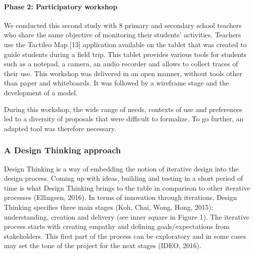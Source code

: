 \documentclass[preprint,12pt]{elsarticle}
\begin{document}
\paragraph{Phase 2: Participatory workshop}
We conducted this second study with 8 primary and secondary school teachers who share the same objective of monitoring their students' activities. Teachers use the Tactileo Map [13] application available on the tablet that was created to guide students during a field trip. This tablet provides various tools for students such as a notepad, a camera, an audio recorder and allows to collect traces of their use. This workshop was delivered in an open manner, without tools other than paper and whiteboards. It was followed by a wireframe stage and the development of a model.

During this workshop, the wide range of needs, contexts of use and preferences led to a diversity of proposals that were difficult to formalize. To go further, an adapted tool was therefore necessary.

\subsubsection{A Design Thinking approach}



Design Thinking is a way of embedding the notion of iterative design into the
design process. Coming up with ideas, building and testing in a short period of time is
what Design Thinking brings to the table in comparison to other iterative processes
(Ellingsen, 2016). In terms of innovation through iterations, Design Thinking specifies
three main stages (Koh, Chai, Wong,  Hong, 2015): understanding, creation and
delivery (see inner square in Figure 1). The iterative process starts with creating
empathy and defining goals/expectations from stakeholders. This first part of the
process can be exploratory and in some cases may set the tone of the project for the
next stages (IDEO, 2016). 
\end{document}
